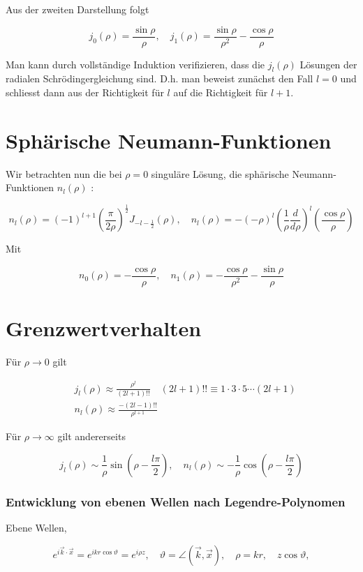 \documentclass[10pt, letterpaper]{article}
\begin{document}
Aus der zweiten Darstellung folgt

$$
j_{0}(\rho)=\frac{\sin \rho}{\rho}, \quad j_{1}(\rho)=\frac{\sin \rho}{\rho^{2}}-\frac{\cos \rho}{\rho}
$$

Man kann durch vollständige Induktion verifizieren, dass die $j_{l}(\rho)$ Lösungen der radialen Schrödingergleichung sind. D.h. man beweist zunächst den Fall $l=0$ und schliesst dann aus der Richtigkeit für $l$ auf die Richtigkeit für $l+1$.

\section*{Sphärische Neumann-Funktionen}
Wir betrachten nun die bei $\rho=0$ singuläre Lösung, die sphärische Neumann-Funktionen $n_{l}(\rho)$ :

$$
n_{l}(\rho)=(-1)^{l+1}\left(\frac{\pi}{2 \rho}\right)^{\frac{1}{2}} J_{-l-\frac{1}{2}}(\rho), \quad n_{l}(\rho)=-(-\rho)^{l}\left(\frac{1}{\rho} \frac{d}{d \rho}\right)^{l}\left(\frac{\cos \rho}{\rho}\right)
$$

Mit

$$
n_{0}(\rho)=-\frac{\cos \rho}{\rho}, \quad n_{1}(\rho)=-\frac{\cos \rho}{\rho^{2}}-\frac{\sin \rho}{\rho}
$$

\section*{Grenzwertverhalten}
Für $\rho \rightarrow 0$ gilt

$$
\begin{aligned}
& j_{l}(\rho) \approx \frac{\rho^{l}}{(2 l+1)!!} \quad(2 l+1)!!\equiv 1 \cdot 3 \cdot 5 \cdots(2 l+1) \\
& n_{l}(\rho) \approx \frac{-(2 l-1)!!}{\rho^{l+1}}
\end{aligned}
$$

Für $\rho \rightarrow \infty$ gilt andererseits

$$
j_{l}(\rho) \sim \frac{1}{\rho} \sin \left(\rho-\frac{l \pi}{2}\right), \quad n_{l}(\rho) \sim-\frac{1}{\rho} \cos \left(\rho-\frac{l \pi}{2}\right)
$$

\subsubsection*{Entwicklung von ebenen Wellen nach Legendre-Polynomen}
Ebene Wellen,

$$
e^{i \vec{k} \cdot \vec{x}}=e^{i k r \cos \vartheta}=e^{i \rho z}, \quad \vartheta=\angle(\vec{k}, \vec{x}), \quad \rho=k r, \quad z \cos \vartheta,
$$
\end{document}
